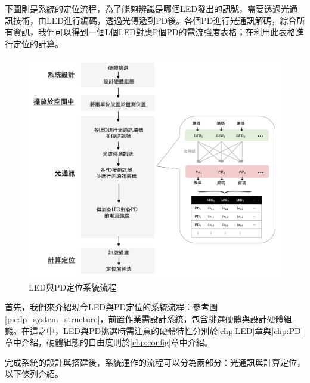     下圖則是系統的定位流程，為了能夠辨識是哪個LED發出的訊號，需要透過光通訊技術，由LED進行編碼，透過光傳遞到PD後。各個PD進行光通訊解碼，綜合所有資訊，我們可以得到一個L個LED對應P個PD的電流強度表格；在利用此表格進行定位的計算。


    \begin{figure}[h]
        \centering
        \includegraphics[width=15cm]{ch2pic/lp_system_flow.png}
        \caption{LED與PD定位系統流程}
        \label{pic:lp_system_flow}
    \end{figure}

    首先，我們來介紹現今LED與PD定位的系統流程：參考圖\ref{pic:lp_system_structure}，前置作業需設計系統，包含挑選硬體與設計硬體組態。在這之中，LED與PD挑選時需注意的硬體特性分別於\ref{chp:LED}章與\ref{chp:PD}章中介紹，硬體組態的自由度則於\ref{chp:config}章中介紹。
    
    完成系統的設計與搭建後，系統運作的流程可以分為兩部分：光通訊與計算定位，以下條列介紹。

    


